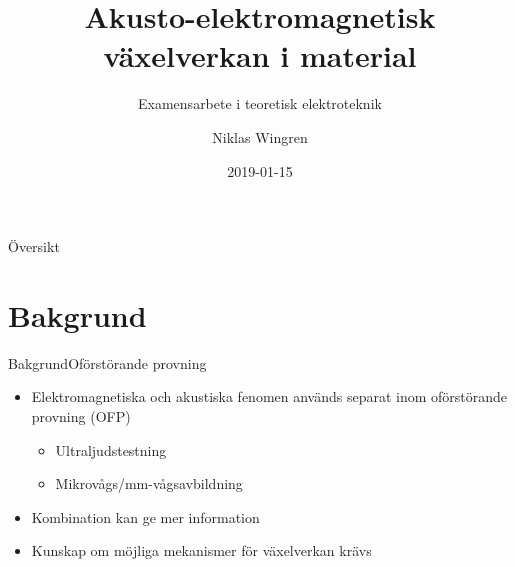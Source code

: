 \documentclass[11pt, final]{beamer}
\begin{document}
	
	\newcommand{\mrm}[1]{\mathrm{#1}}
	\newcommand{\eu}{\mrm{e}}
	\newcommand{\iu}{\mrm{i}}	
	
	\author{Niklas Wingren}
	\title[Akusto-elektromagnetisk växelverkan]{Akusto-elektromagnetisk växelverkan i material}
	\subtitle{Examensarbete i teoretisk elektroteknik}
	\date{2019-01-15}
	\frame[plain]{\maketitle}
	
	\begin{frame}{Översikt}
		\tableofcontents
	\end{frame}
	
	
	\section{Bakgrund}
	
	\begin{frame}{Bakgrund}{Oförstörande provning}
		\begin{itemize}
			\item Elektromagnetiska och akustiska fenomen används separat inom oförstörande provning (OFP)
			\begin{itemize}
				\pause
				\item Ultraljudstestning
				\item Mikrovågs/mm-vågsavbildning
			\end{itemize}
			\pause
			\item Kombination kan ge mer information
			\pause
			\item Kunskap om möjliga mekanismer för växelverkan krävs
		\end{itemize}
	\end{frame}
	
\end{document}
